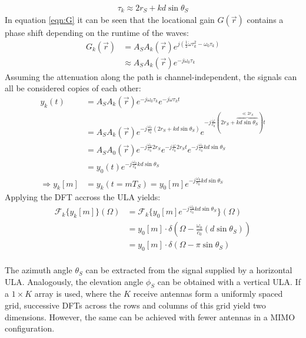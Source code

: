 \begin{align}
    \tau_k \approx 2r_S + kd\sin\theta_S
\end{align}
In equation \ref{eqn:G} it can be seen that the locational gain $G(\vec r)$ contains a phase shift depending on the runtime of the waves:
\begin{align}
    G_k(\vec r) & = A_S A_k(\vec r) e^{j(\frac{1}{2}\dot\omega\tau_k^2- \omega_0\tau_k)} \\
                & \approx A_S A_k(\vec r) e^{-j\omega_0\tau_k}
\end{align}
Assuming the attenuation along the path is channel-independent, the signals can all be considered copies of each other:
\begin{align}
    y_k(t)             & = A_S A_k(\vec r) e^{-j\omega_0\tau_k} e^{-j\dot\omega\tau_k t}      \\
                       & = A_S A_k(\vec r) e^{-j \frac{\omega_0}{c_0}(2r_S + kd\sin\theta_S)}
    e^{-j\frac{\dot\omega}{c_0}(2r_S +  \overbrace{kd\sin\theta_S}^{\text{$\ll 2r_S$}} )t}    \\
                       & = A_S A_0(\vec r) e^{-j \frac{\omega_0}{c_0}2r_S }
    e^{-j\frac{\dot\omega}{c_0}2r_St} e^{-j \frac{\omega_0}{c_0}kd\sin\theta_S}               \\
                       & = y_0(t) e^{-j \frac{\omega_0}{c_0}kd\sin\theta_S}                   \\
    \Rightarrow y_k[m] & = y_k(t=mT_S) = y_0[m]e^{-j \frac{\omega_0}{c_0}kd\sin\theta_S}
\end{align}
Applying the DFT accross the ULA yields:
\begin{align}
    \mathcal{F}_k\{y_k[m]\}(\Omega) & = \mathcal{F}_k\{y_0[m]e^{-j \frac{\omega_0}{c_0}kd\sin\theta_S}\}(\Omega)      \\
                                    & = y_0[m] \cdot \delta \left(\Omega -\frac{\omega_0}{c_0}(d\sin\theta_S) \right) \\
                                    & = y_0[m] \cdot \delta \left(\Omega - \pi\sin\theta_S \right)                    \\
\end{align}

The azimuth angle $\theta_S$ can be extracted from the signal supplied by a horizontal ULA.
Analogously, the elevation angle $\phi_S$ can be obtained with a vertical ULA.
If a $1\times K$ array is used, where the $K$ receive antennas form a uniformly spaced grid,
successive DFTs across the rows and columns of this grid yield two dimensions.
However, the same can be achieved with fewer antennas in a MIMO configuration. \\

